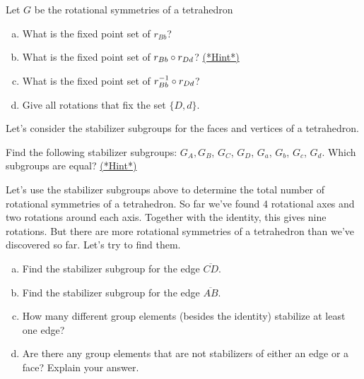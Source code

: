\begin{exercise}\label{exercise:actions:Tetra5}
Let $G$ be the rotational symmetries of a tetrahedron
\begin{enumerate}[(a)]
\item  What is the fixed point set of $r_{Bb}$?
\item What is the fixed point set of $r_{Bb}\circ r_{Dd}$? 
\hyperref[sec:actions:hints]{(*Hint*)}
\item What is the fixed point set of $r_{Bb}^{-1}\circ r_{Dd}$?
\item Give all rotations that fix the set $\{D,d\}$. 
\end{enumerate}
\end{exercise}

Let's consider the stabilizer subgroups for the faces and vertices of a tetrahedron. 

\begin{exercise}\label{exercise:actions:Tetra5a}
Find the following stabilizer subgroups:
$G_{A},  G_{B}$, $G_{C}$, $G_{D}$, $G_{a}$, $G_{b}$, $G_{c}$, $G_{d}$. Which subgroups are equal?
\hyperref[sec:actions:hints]{(*Hint*)}
\end{exercise}

Let's use the stabilizer subgroups above to determine the total number of rotational symmetries of a tetrahedron.  
So far we've found 4 rotational axes and two rotations around each axis. Together with the identity, this gives nine rotations. But there are more rotational symmetries of a tetrahedron than we've discovered so far.  Let's try to find them. 

\begin{exercise}\label{exercise:actions:Tetra7}
\begin{enumerate}[(a)]
\item Find the stabilizer subgroup for the edge $\overline{CD}$. 
\item Find the stabilizer subgroup for the edge $\overline{AB}$.
\item How many different group elements (besides the identity) stabilize at least one edge?
\item Are there any group elements that are not stabilizers of either an edge or a face?  Explain your answer.
\end{enumerate}
\end{exercise}	

